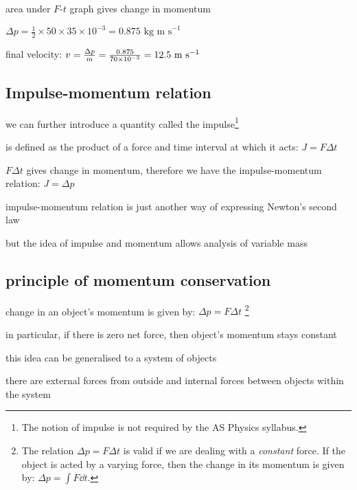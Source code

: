 \begin{soln} area under $F$-$t$ graph gives change in momentum

{
	\centering
	
	$ \Delta p = \frac{1}{2} \times 50 \times 35\times10^{-3} = 0.875 \text{ kg m s}^{-1} $
	
}

final velocity: $v = \frac{\Delta p}{m} = \frac{0.875}{70\times10^{-3}} = 12.5 \text{ m s$^{-1}$} $ \end{soln}


\subsection{Impulse-momentum relation}

we can further introduce a quantity called the impulse\footnote{The notion of impulse is not required by the AS Physics syllabus.}

 is defined as the product of a force and time interval at which it acts: $J = F \Delta t$

$F\Delta t$ gives change in momentum, therefore we have the  impulse-momentum relation: $J=\Delta p$

\cmt impulse-momentum relation is just another way of expressing Newton's second law

but the idea of impulse and momentum allows analysis of variable mass




\subsection{principle of momentum conservation}\label{ch:momentum-conservation}

change in an object's momentum is given by: $\Delta p = F \Delta t$
\footnote{The relation $\Delta p = F \Delta t$ is valid if we are dealing with a \emph{constant} force. If the object is acted by a varying force, then the change in its momentum is given by: $\Delta p = \int F \dd t$.}

in particular, if there is zero net force, then object's momentum stays constant


this idea can be generalised to a system of objects

there are external forces from outside and internal forces between objects within the system

